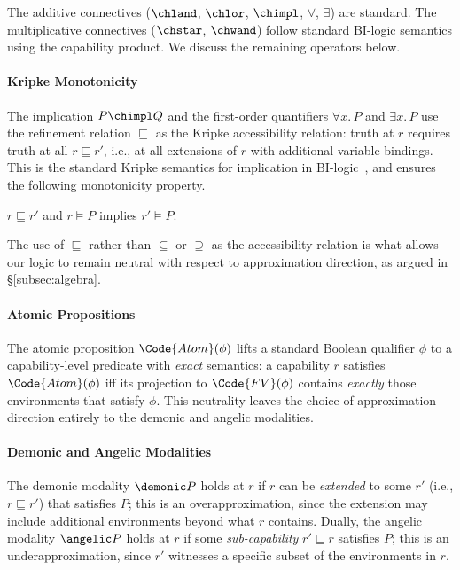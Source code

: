 The additive connectives ($\chland$, $\chlor$, $\chimpl$, $\forall$,
$\exists$) are standard.  The multiplicative connectives ($\chstar$,
$\chwand$) follow standard BI-logic semantics using the capability
product.  We discuss the remaining operators below.

\paragraph{Kripke Monotonicity}
The implication $P \chimpl Q$ and the first-order quantifiers
$\forall x.\, P$ and $\exists x.\, P$
use the refinement
relation $\sqsubseteq$ as the Kripke accessibility relation: truth at
$r$ requires truth at all $r \sqsubseteq r'$, i.e., at all extensions
of $r$ with additional variable bindings.  This is the standard Kripke
semantics for implication in BI-logic~\cite{...}, and ensures the
following monotonicity property.

\begin{theorem}\label{thm:kripke-monotonicity}
  $r \sqsubseteq r'$ and $r \models P$ implies $r' \models P$.
\end{theorem}

The use of $\sqsubseteq$ rather than $\subseteq$ or $\supseteq$ as the
accessibility relation is what allows our logic to remain neutral with
respect to approximation direction, as argued in
\S\ref{subsec:algebra}.

\paragraph{Atomic Propositions}
The atomic proposition $\Code{Atom}(\phi)$ lifts a standard Boolean
qualifier $\phi$ to a capability-level predicate with \emph{exact}
semantics: a capability $r$ satisfies $\Code{Atom}(\phi)$ iff its
projection to $\Code{FV}(\phi)$ contains \emph{exactly} those
environments that satisfy $\phi$.  This neutrality leaves the choice
of approximation direction entirely to the demonic and angelic
modalities.

\paragraph{Demonic and Angelic Modalities}
The demonic modality $\demonic P$ holds at $r$ if $r$ can be
\emph{extended} to some $r'$ (i.e., $r \sqsubseteq r'$) that satisfies
$P$; this is an overapproximation, since the extension may include
additional environments beyond what $r$ contains.  Dually, the angelic
modality $\angelic P$ holds at $r$ if some \emph{sub-capability} $r'
\sqsubseteq r$ satisfies $P$; this is an underapproximation, since $r'$
witnesses a specific subset of the environments in $r$.

